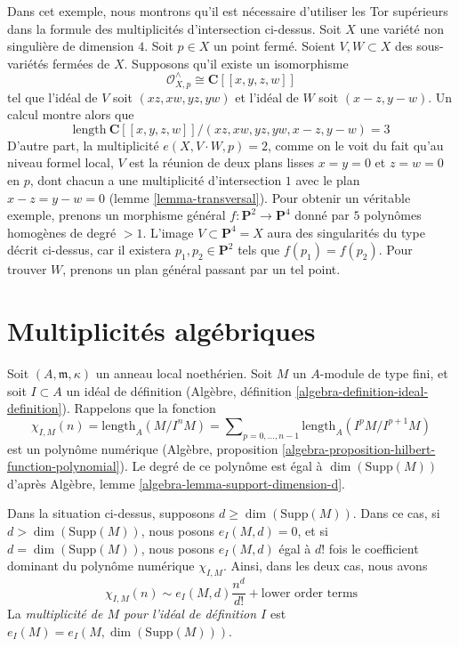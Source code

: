 \begin{example}
\label{example-naive-multiplicity-wrong}
Dans cet exemple, nous montrons qu'il est nécessaire d'utiliser les
Tor supérieurs dans la formule des multiplicités d'intersection ci-dessus.
Soit $X$ une variété non singulière de dimension $4$.
Soit $p \in X$ un point fermé. Soient $V, W \subset X$
des sous-variétés fermées de $X$. Supposons qu'il existe un
isomorphisme
$$
\mathcal{O}_{X, p}^\wedge \cong \mathbf{C}[[x, y, z, w]]
$$
tel que l'idéal de $V$ soit $(xz, xw, yz, yw)$ et l'idéal
de $W$ soit $(x - z, y - w)$. Un calcul montre alors que
$$
\text{length}\ \mathbf{C}[[x, y, z, w]]/
(xz, xw, yz, yw, x - z, y - w) = 3
$$
D'autre part, la multiplicité $e(X, V \cdot W, p) = 2$,
comme on le voit du fait qu'au niveau formel local, $V$ est la
réunion de deux plans lisses $x = y = 0$ et $z = w = 0$ en $p$,
dont chacun a une multiplicité d'intersection $1$ avec le plan
$x - z = y - w = 0$ (lemme \ref{lemma-transversal}). Pour obtenir un
véritable exemple, prenons
un morphisme général $f : \mathbf{P}^2 \to \mathbf{P}^4$ donné par
$5$ polynômes homogènes de degré $> 1$. L'image
$V \subset \mathbf{P}^4 = X$ aura des singularités du type
décrit ci-dessus, car il existera $p_1, p_2 \in \mathbf{P}^2$
tels que $f(p_1) = f(p_2)$. Pour trouver $W$, prenons un plan général passant
par un tel point.
\end{example}






\section{Multiplicités algébriques}
\label{section-multiplicities}

\noindent
Soit $(A, \mathfrak m, \kappa)$ un anneau local noethérien.
Soit $M$ un $A$-module de type fini, et soit $I \subset A$ un idéal
de définition (Algèbre, définition \ref{algebra-definition-ideal-definition}).
Rappelons que la fonction
$$
\chi_{I, M}(n) = \text{length}_A(M/I^nM) =
\sum\nolimits_{p = 0, \ldots, n - 1} \text{length}_A(I^pM/I^{p + 1}M)
$$
est un polynôme numérique
(Algèbre, proposition \ref{algebra-proposition-hilbert-function-polynomial}).
Le degré de ce polynôme est égal à $\dim(\text{Supp}(M))$ d'après
Algèbre, lemme \ref{algebra-lemma-support-dimension-d}.

\begin{definition}
\label{definition-multiplicity}
Dans la situation ci-dessus, supposons $d \geq \dim(\text{Supp}(M))$.
Dans ce cas, si $d > \dim(\text{Supp}(M))$, nous posons $e_I(M, d) = 0$,
et si $d = \dim(\text{Supp}(M))$, nous posons $e_I(M, d)$ égal à $d!$
fois le coefficient dominant du polynôme numérique $\chi_{I, M}$.
Ainsi, dans les deux cas, nous avons
$$
\chi_{I, M}(n) \sim e_I(M, d) \frac{n^d}{d!} + \text{lower order terms}
$$
La {\it multiplicité de $M$ pour l'idéal de définition $I$}
est $e_I(M) = e_I(M, \dim(\text{Supp}(M)))$.
\end{definition}

